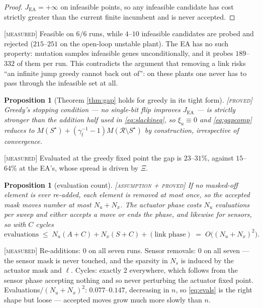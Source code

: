 \documentclass[11pt]{article}
\newtheorem{proposition}[theorem]{Proposition}
\theoremstyle{definition}
\theoremstyle{remark}
\newcommand{\JEA}{J_{\mathrm{EA}}}
\newcommand{\gf}{\gamma_{\mathrm{f}}}
\newcommand{\Rset}{\mathcal{R}}
\newcommand{\Sstar}{S^{\star}}
\newcommand{\tagged}[1]{\textsc{[#1]}}
\begin{document}
\begin{proof}
$\JEA = +\infty$ on infeasible points, so any infeasible candidate has cost
strictly greater than the current finite incumbent and is never accepted.
\end{proof}

\tagged{measured} Feasible on $6/6$ runs, while $4$--$10$ infeasible candidates are
probed and rejected ($215$--$251$ on the open-loop unstable plant). The EA has no
such property: mutation samples infeasible genes unconditionally, and it probes
$189$--$332$ of them per run. This contradicts the argument that removing a link
risks ``an infinite jump greedy cannot back out of'': on these plants one never has
to pass through the infeasible set at all.

\begin{proposition}[Theorem \ref{thm:gap} holds for greedy in its tight form]\label{prop:G3} \tagged{proved}
Greedy's stopping condition --- no single-bit flip improves $\JEA$ --- is strictly
stronger than the addition half used in \eqref{eq:slackineq}, so $\xi_u \equiv 0$
and \eqref{eq:gapcomp} reduces to $M(\Sstar) + (\gf^{-1}-1)M(\Rset\setminus\Sstar)$
by construction, irrespective of convergence.
\end{proposition}

\tagged{measured} Evaluated at the greedy fixed point the gap is $23$--$31\%$,
against $15$--$64\%$ at the EA's, whose spread is driven by $\Xi$.

\begin{proposition}[evaluation count]\label{prop:G2} \tagged{assumption + proved}
If no masked-off element is ever re-added, each element is removed at most once, so
the accepted mask moves number at most $N_u + N_x$. The actuator phase costs $N_u$
evaluations per sweep and either accepts a move or ends the phase, and likewise for
sensors, so with $C$ cycles
\begin{equation}\label{eq:evals}
  \text{evaluations} \;\leq\; N_u(A + C) + N_x(S + C) + (\text{link phase})
  \;=\; O\bigl((N_u + N_x)^2\bigr).
\end{equation}
\end{proposition}

\tagged{measured} Re-additions: $0$ on all seven runs. Sensor removals: $0$ on all
seven --- the sensor mask is never touched, and the sparsity in $N_s$ is induced by
the actuator mask and $\ell$. Cycles: exactly $2$ everywhere, which follows from
the sensor phase accepting nothing and so never perturbing the actuator fixed
point. Evaluations$/(N_u+N_x)^2$: $0.077$--$0.147$, decreasing in $n$, so
\eqref{eq:evals} is the right shape but loose --- accepted moves grow much more
slowly than $n$.
\end{document}
